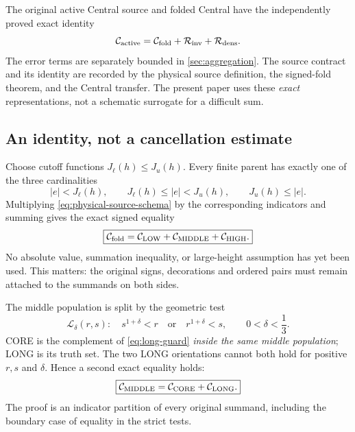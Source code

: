 \documentclass[11pt]{article}
\theoremstyle{definition}
\theoremstyle{remark}
\newcommand{\1}{\mathbf 1}
\begin{document}
The original active Central source and folded Central have the
independently proved exact identity
\begin{equation}\label{eq:active-folded}
 \mathcal C_{\rm active}=
  \mathcal C_{\rm fold}+\mathcal R_{\rm inv}+\mathcal R_{\rm dens}.
\end{equation}
The error terms are separately bounded in \cref{sec:aggregation}.
The source contract and its identity are recorded by the
physical source definition, the signed-fold theorem, and the
Central transfer. The present paper uses these \emph{exact}
representations, not a schematic surrogate for a difficult sum.

\subsection{An identity, not a cancellation estimate}

Choose cutoff functions $J_\ell(h)\le J_u(h)$. Every finite
parent has exactly one of the three cardinalities
\[
 |e|<J_\ell(h),\qquad
 J_\ell(h)\le|e|<J_u(h),\qquad
 J_u(h)\le|e|.
\]
Multiplying \eqref{eq:physical-source-schema} by the corresponding
indicators and summing gives the exact signed equality
\begin{equation}\label{eq:sector-partition}
 \boxed{\mathcal C_{\rm fold}
  =\mathcal C_{\rm LOW}+\mathcal C_{\rm MIDDLE}
   +\mathcal C_{\rm HIGH}.}
\end{equation}
No absolute value, summation inequality, or large-height assumption
has yet been used. This matters: the original signs, decorations and
ordered pairs must remain attached to the summands on both sides.

The middle population is split by the geometric test
\begin{equation}\label{eq:long-guard}
 \mathcal L_\delta(r,s):
 \quad s^{1+\delta}<r\quad\text{or}\quad r^{1+\delta}<s,
 \qquad 0<\delta<\frac13.
\end{equation}
CORE is the complement of \eqref{eq:long-guard} \emph{inside the
same middle population}; LONG is its truth set. The two LONG
orientations cannot both hold for positive $r,s$ and $\delta$.
Hence a second exact equality holds:
\begin{equation}\label{eq:middle-partition}
 \boxed{\mathcal C_{\rm MIDDLE}
   =\mathcal C_{\rm CORE}+\mathcal C_{\rm LONG}.}
\end{equation}
The proof is an indicator partition of every original summand,
including the boundary case of equality in the strict tests.
\end{document}
